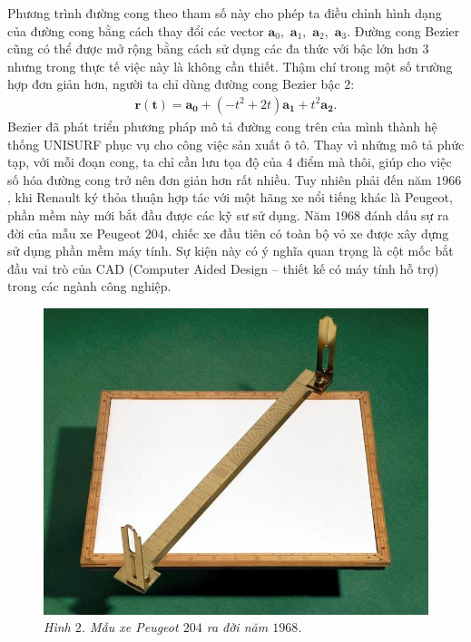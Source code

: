 \begin{multicols}{2}
	Phương trình đường cong theo tham số này cho phép ta điều chỉnh hình dạng của đường cong bằng cách thay đổi các vector $\pmb a_0,$ $\pmb a_1,$ $\pmb a_2,$ $\pmb a_3$. Đường cong Bezier cũng có thể được mở rộng bằng cách sử dụng các đa thức với bậc lớn hơn $3$ nhưng trong thực tế việc này là không cần thiết. Thậm chí trong một số trường hợp đơn giản hơn, người ta chỉ dùng đường cong Bezier bậc $2$:
	\begin{align*}
		\pmb{r(t)}=\pmb{a_0}+(-t^2+2t) \pmb{a_1}+t^2 \pmb{a_2}.
	\end{align*}
	Bezier đã phát triển phương pháp mô tả đường cong trên của mình thành hệ thống UNISURF phục vụ cho công việc sản xuất ô tô. Thay vì những mô tả phức tạp, với mỗi đoạn cong, ta chỉ cần lưu tọa độ của $4$ điểm mà thôi, giúp cho việc số hóa đường cong trở nên đơn giản hơn rất nhiều. Tuy nhiên phải đến năm $1966$, khi Renault ký thỏa thuận hợp tác với một hãng xe nổi tiếng khác là Peugeot, phần mềm này mới bắt đầu được các kỹ sư sử dụng. Năm $1968$ đánh dấu sự ra đời của mẫu xe Peugeot $204$, chiếc xe đầu tiên có toàn bộ vỏ xe được xây dựng sử dụng phần mềm máy tính. Sự kiện này có ý nghĩa quan trọng là cột mốc bắt đầu vai trò của CAD (Computer Aided Design -- thiết kế có máy tính hỗ trợ) trong các ngành công nghiệp.
	\begin{figure}[H]
		\vspace*{-5pt}
		\centering
		\captionsetup{labelformat= empty, justification=centering}
		\includegraphics[width= 1\linewidth]{3}
		\caption{\small\textit{\color{toanhocdoisong}Hình $2$. Mẫu xe Peugeot $204$ ra đời năm $1968$.}}

\end{figure}
\end{multicols}
